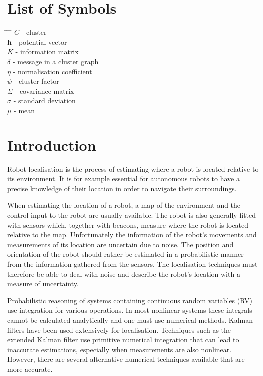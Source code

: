 \documentclass[12pt,oneside,openany,a4paper, %
afrikaans,english,
]{memoir}
\numberwithin{equation}{chapter}
\begin{document}
{\chapter{List of Symbols}
\begin{tabbing}
\hspace*{1em}\= \hspace*{5em} \= \hspace*{3em} \= \kill %
\> $C$	\> - \> cluster\\
\> $\bm{h}$	\> - \> potential vector\\
\> $K$	\> - \> information matrix\\
\> $\delta$ \> - \> message in a cluster graph\\
\> $\eta$ \> - \> normalisation coefficient\\
\> $\psi$ \> - \> cluster factor\\
\> $\Sigma$ \> - \> covariance matrix\\
\> $\sigma$ \> - \> standard deviation\\
\> $\mu$ \> - \> mean

\end{tabbing}



\mainmatter
\chapter{Introduction}
Robot localisation is the process of estimating where a robot is located relative to its environment. It is for example essential for autonomous robots to have a precise knowledge of their location in order to navigate their surroundings.

When estimating the location of a robot, a map of the environment and the control input to the robot are usually available. The robot is also generally fitted with sensors which, together with beacons, measure where the robot is located relative to the map. Unfortunately the information of the robot's movements and measurements of its location are uncertain due to noise. The position and orientation of the robot should rather be estimated in a probabilistic manner from the information gathered from the sensors. The localisation techniques must therefore be able to deal with noise and describe the robot's location with a measure of uncertainty.

Probabilistic reasoning of systems containing continuous random variables (RV) use integration for various operations. In most nonlinear systems these integrals cannot be calculated analytically and one must use numerical methods. Kalman filters have been used extensively for localisation. Techniques such as the extended Kalman filter use primitive numerical integration that can lead to inaccurate estimations, especially when measurements are also nonlinear. However, there are several alternative numerical techniques available that are more accurate.

}
\end{document}
